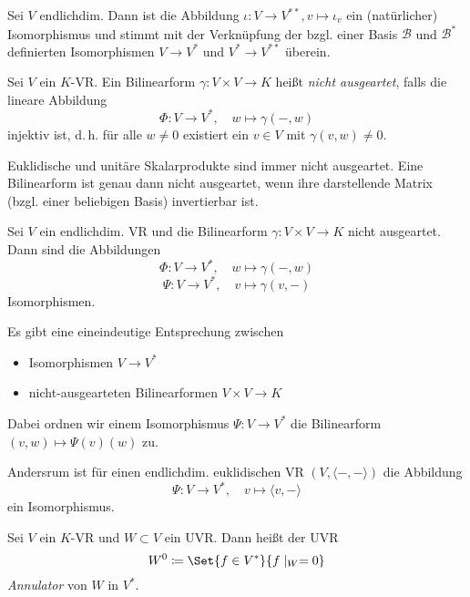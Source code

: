 \documentclass{cheat-sheet}
\newcommand{\BB}{\mathcal{B}}
\begin{document}
\begin{satz}
Sei $V$ endlichdim. Dann ist die Abbildung $\iota : V \to V^{**}, v \mapsto \iota_v$ ein (natürlicher) Isomorphismus und stimmt mit der Verknüpfung der bzgl. einer Basis $\BB$ und $\mathcal{B^*}$ definierten Isomorphismen $V \to V^*$ und $V^* \to V^{**}$ überein.
\end{satz}

\begin{defn}
Sei $V$ ein $K$-VR. Ein Bilinearform $\gamma : V \times V \to K$ heißt \emph{nicht ausgeartet}, falls die lineare Abbildung
\[ \Phi : V \to V^{*}, \quad w \mapsto \gamma(-, w) \]
injektiv ist, d.\,h. für alle $w \not= 0$ existiert ein $v \in V$ mit $\gamma(v, w) \not= 0$.
\end{defn}

\begin{bem}
Euklidische und unitäre Skalarprodukte sind immer nicht ausgeartet.
Eine Bilinearform ist genau dann nicht ausgeartet, wenn ihre darstellende Matrix (bzgl. einer beliebigen Basis) invertierbar ist.
\end{bem}

\begin{satz}
Sei $V$ ein endlichdim. VR und die Bilinearform $\gamma : V \times V \to K$ nicht ausgeartet. Dann sind die Abbildungen
\[ \Phi : V \to V^*, \quad w \mapsto \gamma(-, w) \]
\[ \Psi : V \to V^*, \quad v \mapsto \gamma(v, -) \]
Isomorphismen.
\end{satz}

\begin{satz}
Es gibt eine eineindeutige Entsprechung zwischen
\begin{itemize}
  \item Isomorphismen $V \to V^*$
  \item nicht-ausgearteten Bilinearformen $V \times V \to K$
\end{itemize}

Dabei ordnen wir einem Isomorphismus $\Psi : V \to V^*$ die Bilinearform $(v, w) \mapsto \Psi(v)(w)$ zu.

Andersrum ist für einen endlichdim. euklidischen VR $(V, \langle - , - \rangle)$ die Abbildung
\[ \Psi : V \to V^*, \quad v \mapsto \langle v , - \rangle \]
ein Isomorphismus.
\end{satz}

\begin{defn}
Sei $V$ ein $K$-VR und $W \subset V$ ein UVR. Dann heißt der UVR
\[ W^0 \coloneqq \Set{ f \in V^* }{ f\mid_W = 0 } \]
\emph{Annulator} von $W$ in $V^*$.
\end{defn}
\end{document}
